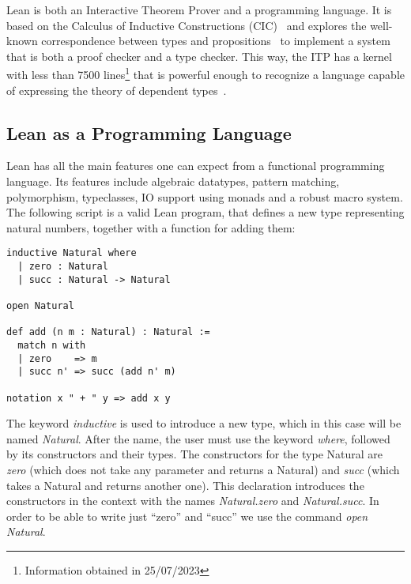 
Lean is both an Interactive Theorem Prover and a programming
language. It is based on the Calculus of Inductive Constructions (CIC)~\cite{cic_ref} and explores the well-known correspondence between types and propositions~\cite{ch_correspondence} to implement a system that is both a proof checker and a type checker. This way, the ITP has a kernel with less than 7500 lines\footnote{Information obtained in 25/07/2023} that is powerful enough to recognize a language capable of expressing the theory of dependent types~\cite{dep_type_theory}.

\subsection{Lean as a Programming Language}

Lean has all the main features one can expect from a functional programming language. Its features include algebraic datatypes, pattern matching, polymorphism, typeclasses, IO support using monads and a robust macro system. The following script is a valid Lean program, that defines a new type representing natural numbers, together with a function for adding them:

\begin{verbatim}
inductive Natural where
  | zero : Natural
  | succ : Natural -> Natural

open Natural

def add (n m : Natural) : Natural :=
  match n with
  | zero    => m
  | succ n' => succ (add n' m)

notation x " + " y => add x y
\end{verbatim}

The keyword \textit{inductive} is used to introduce a new type, which in this case will be named \textit{Natural}. After the name, the user must use the keyword \textit{where}, followed by its constructors and their types. The constructors for the type Natural are \textit{zero} (which does not take any parameter and returns a Natural) and \textit{succ} (which takes a Natural and returns another one). This declaration introduces the constructors in the context with the names \textit{Natural.zero} and \textit{Natural.succ}. In order to be able to write just ``zero'' and ``succ'' we use the command \textit{open Natural}.

